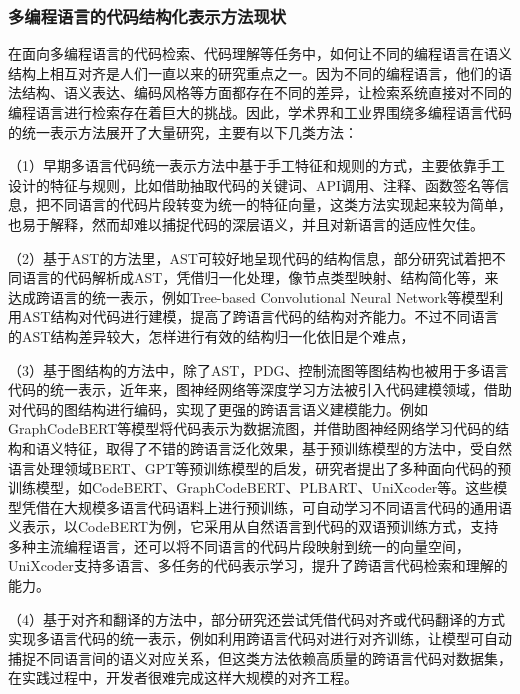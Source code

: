\documentclass[UTF8,a4paper,12pt]{ctexart}
\numberwithin{equation}{section}
\begin{document}
\subsubsection{多编程语言的代码结构化表示方法现状}
在面向多编程语言的代码检索、代码理解等任务中，如何让不同的编程语言在语义结构上相互对齐是人们一直以来的研究重点之一。因为不同的编程语言，他们的语法结构、语义表达、编码风格等方面都存在不同的差异，让检索系统直接对不同的编程语言进行检索存在着巨大的挑战。因此，学术界和工业界围绕多编程语言代码的统一表示方法展开了大量研究，主要有以下几类方法：\par
（1）早期多语言代码统一表示方法中基于手工特征和规则的方式，主要依靠手工设计的特征与规则，比如借助抽取代码的关键词、API调用、注释、函数签名等信息，把不同语言的代码片段转变为统一的特征向量，这类方法实现起来较为简单，也易于解释，然而却难以捕捉代码的深层语义，并且对新语言的适应性欠佳。\par
（2）基于AST的方法里，AST可较好地呈现代码的结构信息，部分研究试着把不同语言的代码解析成AST，凭借归一化处理，像节点类型映射、结构简化等，来达成跨语言的统一表示，例如Tree-based Convolutional Neural Network\cite{ref8}等模型利用AST结构对代码进行建模，提高了跨语言代码的结构对齐能力。不过不同语言的AST结构差异较大，怎样进行有效的结构归一化依旧是个难点，\par
（3）基于图结构的方法中，除了AST，PDG、控制流图等图结构也被用于多语言代码的统一表示，近年来，图神经网络等深度学习方法被引入代码建模领域，借助对代码的图结构进行编码，实现了更强的跨语言语义建模能力。例如GraphCodeBERT\cite{ref8.5}等模型将代码表示为数据流图，并借助图神经网络学习代码的结构和语义特征，取得了不错的跨语言泛化效果，基于预训练模型的方法中，受自然语言处理领域BERT、GPT等预训练模型的启发，研究者提出了多种面向代码的预训练模型，如CodeBERT\cite{ref9}、GraphCodeBERT、PLBART\cite{ref10}、UniXcoder\cite{ref11}等。这些模型凭借在大规模多语言代码语料上进行预训练，可自动学习不同语言代码的通用语义表示，以CodeBERT为例，它采用从自然语言到代码的双语预训练方式，支持多种主流编程语言，还可以将不同语言的代码片段映射到统一的向量空间，UniXcoder支持多语言、多任务的代码表示学习，提升了跨语言代码检索和理解的能力。\par
（4）基于对齐和翻译的方法中，部分研究还尝试凭借代码对齐或代码翻译的方式实现多语言代码的统一表示，例如利用跨语言代码对进行对齐训练，让模型可自动捕捉不同语言间的语义对应关系，但这类方法依赖高质量的跨语言代码对数据集，在实践过程中，开发者很难完成这样大规模的对齐工程。\par
\end{document}
